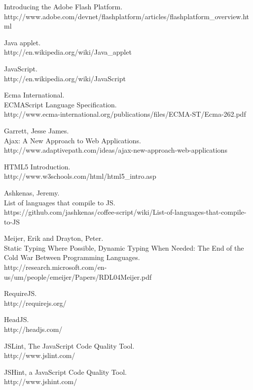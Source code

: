 \begin{thebibliography}{99}

	Introducing the Adobe Flash Platform.\\
	http://www.adobe.com/devnet/flashplatform/articles/flashplatform\_overview.html
	
	Java applet.\\
	http://en.wikipedia.org/wiki/Java\_applet
	
	JavaScript.\\
	http://en.wikipedia.org/wiki/JavaScript
	
	{\sc Ecma} International.\\
	ECMAScript Language Specification.\\
	http://www.ecma-international.org/publications/files/ECMA-ST/Ecma-262.pdf
	
	{\sc Garrett,} Jesse James.\\
	Ajax: A New Approach to Web Applications.\\
	http://www.adaptivepath.com/ideas/ajax-new-approach-web-applications

	HTML5 Introduction.\\
	http://www.w3schools.com/html/html5\_intro.asp

  {\sc Ashkenas,} Jeremy.\\
  List of languages that compile to JS.\\
  https://github.com/jashkenas/coffee-script/wiki/List-of-languages-that-compile-to-JS
	
	{\sc Meijer,} Erik and {\sc Drayton,} Peter.\\
	Static Typing Where Possible, Dynamic Typing When Needed: The End of the Cold War Between Programming Languages.\\
	http://research.microsoft.com/en-us/um/people/emeijer/Papers/RDL04Meijer.pdf
	
	RequireJS.\\
	http://requirejs.org/
	
	HeadJS.\\
	http://headjs.com/
	
	JSLint, The JavaScript Code Quality Tool.\\
	http://www.jslint.com/
	
	JSHint, a JavaScript Code Quality Tool.\\
	http://www.jshint.com/


\end{thebibliography}
